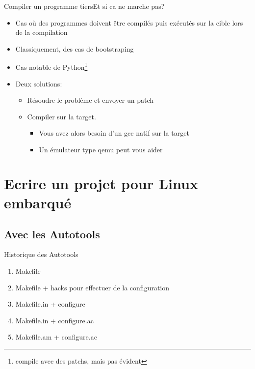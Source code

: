 \begin{frame}{Compiler un programme tiers}{Et si ca ne marche pas?}
  \begin{itemize}
  \item Cas où  des programmes doivent être compilés  puis exécutés sur la cible
    lors de la compilation
  \item Classiquement, des cas de bootstraping
  \item Cas  notable de Python\footnote{compile avec  des patchs, mais
      pas évident}
  \item Deux solutions:
    \begin{itemize}
    \item Résoudre le problème et envoyer un patch
    \item Compiler sur la target.
      \begin{itemize}
      \item Vous avez alors besoin d'un gcc natif sur la target
      \item Un émulateur type qemu peut vous aider
      \end{itemize}
    \end{itemize}
  \end{itemize}
\end{frame}


\section{Ecrire un projet pour Linux embarqué}

\subsection{Avec les Autotools}

\begin{frame}[fragile=singleslide]{Historique des Autotools}
  \begin{enumerate}
  \item Makefile
  \item Makefile + hacks pour effectuer de la configuration
  \item Makefile.in + configure
  \item Makefile.in + configure.ac
  \item Makefile.am + configure.ac
  \end{enumerate}
\end{frame}


